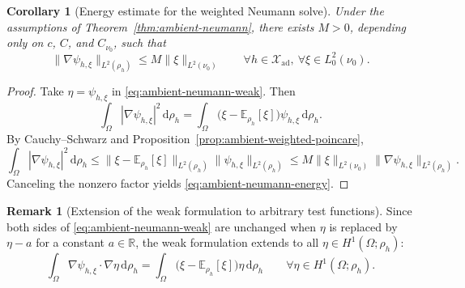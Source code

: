 \documentclass{article}
\newtheorem{corollary}[theorem]{Corollary}
\theoremstyle{definition}
\newtheorem{remark}[theorem]{Remark}
\renewcommand{\d}{\mathrm{d}}
\begin{document}
\begin{corollary}[Energy estimate for the weighted Neumann solve]
    \label{cor:ambient-neumann-energy}
    Under the assumptions of Theorem~\ref{thm:ambient-neumann}, there exists \(M>0\),
    depending only on \(c\), \(C\), and \(C_{\nu_0}\), such that
    \begin{equation}
        \label{eq:ambient-neumann-energy}
        \|\nabla\psi_{h,\xi}\|_{L^2(\rho_h)}
        \le
        M\|\xi\|_{L^2(\nu_0)}
        \qquad
        \forall h\in\mathcal X_{\mathrm{ad}},\ \forall \xi\in L^2_0(\nu_0).
    \end{equation}
\end{corollary}

\begin{proof}
    Take \(\eta=\psi_{h,\xi}\) in \eqref{eq:ambient-neumann-weak}. Then
    \[
        \int_\Omega |\nabla\psi_{h,\xi}|^2\,\d\rho_h
        =
        \int_\Omega
        \bigl(\xi-\mathbb E_{\rho_h}[\xi]\bigr)\psi_{h,\xi}\,\d\rho_h.
    \]
    By Cauchy--Schwarz and Proposition~\ref{prop:ambient-weighted-poincare},
    \[
        \int_\Omega |\nabla\psi_{h,\xi}|^2\,\d\rho_h
        \le
        \|\xi-\mathbb E_{\rho_h}[\xi]\|_{L^2(\rho_h)}
        \|\psi_{h,\xi}\|_{L^2(\rho_h)}
        \le
        M\|\xi\|_{L^2(\nu_0)}
        \|\nabla\psi_{h,\xi}\|_{L^2(\rho_h)}.
    \]
    Canceling the nonzero factor yields \eqref{eq:ambient-neumann-energy}.
\end{proof}

\begin{remark}[Extension of the weak formulation to arbitrary test functions]
    \label{rem:ambient-neumann-all-tests}
    Since both sides of \eqref{eq:ambient-neumann-weak} are unchanged when \(\eta\) is replaced
    by \(\eta-a\) for a constant \(a\in\mathbb R\), the weak formulation extends to all
    \(\eta\in H^1(\Omega;\rho_h)\):
    \begin{equation}
        \label{eq:ambient-neumann-all-tests}
        \int_\Omega \nabla\psi_{h,\xi}\cdot\nabla\eta\,\d\rho_h
        =
        \int_\Omega
        \bigl(\xi-\mathbb E_{\rho_h}[\xi]\bigr)\eta\,\d\rho_h
        \qquad
        \forall \eta\in H^1(\Omega;\rho_h).
    \end{equation}
\end{remark}
\end{document}
